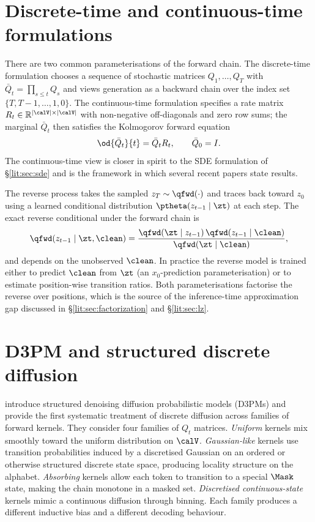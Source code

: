 \section{Discrete-time and continuous-time formulations}
\label{lit:sec:dt-ct}

There are two common parameterisations of the forward chain. The
discrete-time formulation chooses a sequence of stochastic matrices
$Q_1,\ldots,Q_T$ with $\bar Q_t = \prod_{s\leq t}Q_s$ and views generation
as a backward chain over the index set $\{T,T-1,\ldots,1,0\}$. The
continuous-time formulation specifies a rate matrix
$R_t\in\mathbb{R}^{|\calV|\times|\calV|}$ with non-negative off-diagonals
and zero row sums; the marginal $\bar Q_t$ then satisfies the Kolmogorov
forward equation
\[
  \od{\bar Q_t}{t} = \bar Q_t R_t, \qquad \bar Q_0 = I.
\]
The continuous-time view is closer in spirit to the SDE formulation of
\S\ref{lit:sec:sde} and is the framework in which several recent papers
state results.

The reverse process takes the sampled $z_T \sim \qfwd(\cdot)$ and traces
back toward $z_0$ using a learned conditional distribution
$\ptheta(z_{t-1}\mid \zt)$ at each step. The exact reverse conditional under
the forward chain is
\[
  \qfwd(z_{t-1}\mid \zt, \clean)
  = \frac{\qfwd(\zt\mid z_{t-1})\,\qfwd(z_{t-1}\mid \clean)}{\qfwd(\zt\mid \clean)},
\]
and depends on the unobserved $\clean$. In practice the reverse model is
trained either to predict $\clean$ from $\zt$ (an $x_0$-prediction
parameterisation) or to estimate position-wise transition ratios. Both
parameterisations factorise the reverse over positions, which is the source
of the inference-time approximation gap discussed in
\S\ref{lit:sec:factorization} and \S\ref{lit:sec:lz}.

\section{D3PM and structured discrete diffusion}
\label{lit:sec:d3pm}

\textcite{austin2021d3pm} introduce structured denoising diffusion
probabilistic models (D3PMs) and provide the first systematic treatment of
discrete diffusion across families of forward kernels. They consider four
families of $Q_t$ matrices. \emph{Uniform} kernels mix smoothly toward the
uniform distribution on $\calV$. \emph{Gaussian-like} kernels use transition
probabilities induced by a discretised Gaussian on an ordered or
otherwise structured discrete state space, producing locality structure
on the alphabet. \emph{Absorbing} kernels
allow each token to transition to a special $\Mask$ state, making the chain
monotone in a masked set. \emph{Discretised continuous-state} kernels mimic
a continuous diffusion through binning. Each family produces a different
inductive bias and a different decoding behaviour.

